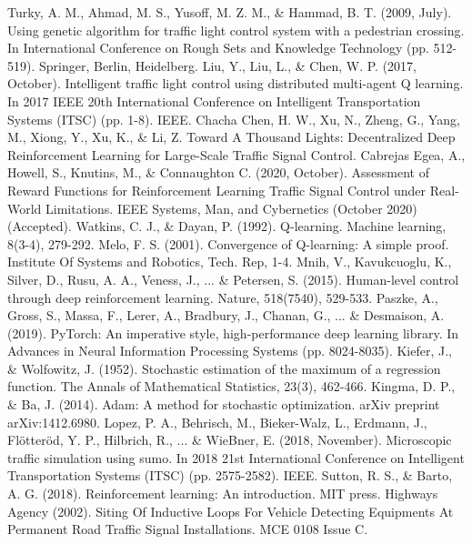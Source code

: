 \documentclass[conference]{IEEEtran}
\begin{document}
\begin{thebibliography}{0}
 Turky, A. M., Ahmad, M. S., Yusoff, M. Z. M., \& Hammad, B. T. (2009, July). Using genetic algorithm for traffic light control system with a pedestrian crossing. In International Conference on Rough Sets and Knowledge Technology (pp. 512-519). Springer, Berlin, Heidelberg.
 Liu, Y., Liu, L., \& Chen, W. P. (2017, October). Intelligent traffic light control using distributed multi-agent Q learning. In 2017 IEEE 20th International Conference on Intelligent Transportation Systems (ITSC) (pp. 1-8). IEEE.
 Chacha Chen, H. W., Xu, N., Zheng, G., Yang, M., Xiong, Y., Xu, K., \& Li, Z. Toward A Thousand Lights: Decentralized Deep Reinforcement Learning for Large-Scale Traffic Signal Control.
 Cabrejas Egea, A., Howell, S., Knutins, M., \& Connaughton C. (2020, October). Assessment of Reward Functions for Reinforcement Learning Traffic Signal Control under Real-World Limitations. IEEE Systems, Man, and Cybernetics (October 2020) (Accepted). 
 Watkins, C. J., \& Dayan, P. (1992). Q-learning. Machine learning, 8(3-4), 279-292.
 Melo, F. S. (2001). Convergence of Q-learning: A simple proof. Institute Of Systems and Robotics, Tech. Rep, 1-4.
 Mnih, V., Kavukcuoglu, K., Silver, D., Rusu, A. A., Veness, J.,  ... \& Petersen, S. (2015). Human-level control through deep reinforcement learning. Nature, 518(7540), 529-533.
 Paszke, A., Gross, S., Massa, F., Lerer, A., Bradbury, J., Chanan, G., ... \& Desmaison, A. (2019). PyTorch: An imperative style, high-performance deep learning library. In Advances in Neural Information Processing Systems (pp. 8024-8035).
 Kiefer, J., \& Wolfowitz, J. (1952). Stochastic estimation of the maximum of a regression function. The Annals of Mathematical Statistics, 23(3), 462-466.
 Kingma, D. P., \& Ba, J. (2014). Adam: A method for stochastic optimization. arXiv preprint arXiv:1412.6980.
 Lopez, P. A., Behrisch, M., Bieker-Walz, L., Erdmann, J., Flötteröd, Y. P., Hilbrich, R., ... \& WieBner, E. (2018, November). Microscopic traffic simulation using sumo. In 2018 21st International Conference on Intelligent Transportation Systems (ITSC) (pp. 2575-2582). IEEE.
 Sutton, R. S., \& Barto, A. G. (2018). Reinforcement learning: An introduction. MIT press.
 Highways Agency (2002). Siting Of Inductive Loops For Vehicle Detecting Equipments At Permanent Road Traffic Signal Installations. MCE 0108 Issue C.
\end{thebibliography}


\end{document}
